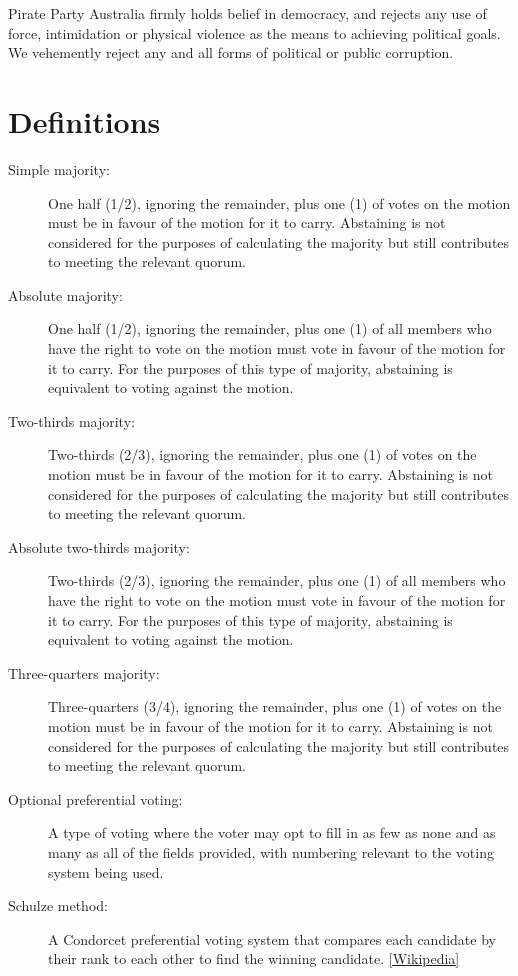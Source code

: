 \documentclass[a4paper,titlepage,8.5pt]{article}
\begin{document}
Pirate Party Australia firmly holds belief in democracy, and rejects any use of force, intimidation or physical violence as the means to achieving political goals. We vehemently reject any and all forms of political or public corruption.
\newpage

\part{Definitions}

\begin{description}
\item[Simple majority:] One half (1/2), ignoring the remainder, plus one (1) of votes on the motion must be in favour of the motion for it to carry. Abstaining is not considered for the purposes of calculating the majority but still contributes to meeting the relevant quorum.
\item[Absolute majority:] One half (1/2), ignoring the remainder, plus one (1) of all members who have the right to vote on the motion must vote in favour of the motion for it to carry. For the purposes of this type of majority, abstaining is equivalent to voting against the motion.
\item[Two-thirds majority:] Two-thirds (2/3), ignoring the remainder, plus one (1) of votes on the motion must be in favour of the motion for it to carry. Abstaining is not considered for the purposes of calculating the majority but still contributes to meeting the relevant quorum.
\item[Absolute two-thirds majority:] Two-thirds (2/3), ignoring the remainder, plus one (1) of all members who have the right to vote on the motion must vote in favour of the motion for it to carry. For the purposes of this type of majority, abstaining is equivalent to voting against the motion.
\item[Three-quarters majority:] Three-quarters (3/4), ignoring the remainder, plus one (1) of votes on the motion must be in favour of the motion for it to carry. Abstaining is not considered for the purposes of calculating the majority but still contributes to meeting the relevant quorum.
\item[Optional preferential voting:] A type of voting where the voter may opt to fill in as few as none and as many as all of the fields provided, with numbering relevant to the voting system being used.
\item[Schulze method:] A Condorcet preferential voting system that compares each candidate by their rank to each other to find the winning candidate. \href{https://en.wikipedia.org/wiki/Schulze\_method}{[Wikipedia]}
\end{description}
\end{document}
